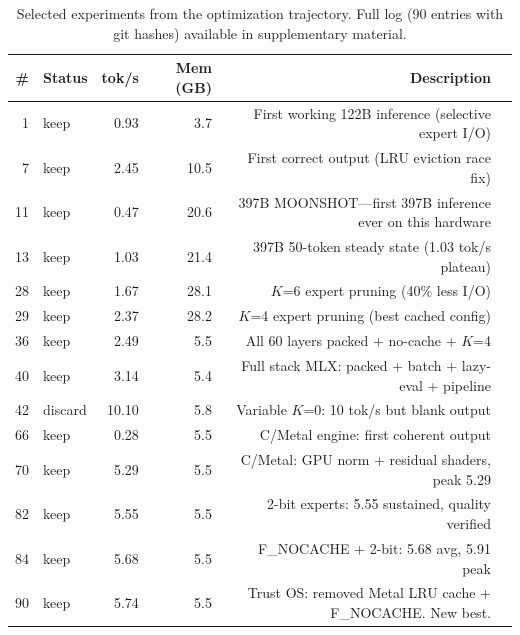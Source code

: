 \documentclass[11pt,twocolumn]{article}
\begin{document}
\begin{table}[h]
\centering
\footnotesize
\caption{Selected experiments from the optimization trajectory. Full log (90 entries with git hashes) available in supplementary material.}
\begin{tabular}{@{}rlrrrl@{}}
\toprule
\textbf{\#} & \textbf{Status} & \textbf{tok/s} & \textbf{Mem (GB)} & \textbf{Description} \\
\midrule
1 & keep & 0.93 & 3.7 & First working 122B inference (selective expert I/O) \\
7 & keep & 2.45 & 10.5 & First correct output (LRU eviction race fix) \\
11 & keep & 0.47 & 20.6 & 397B MOONSHOT---first 397B inference ever on this hardware \\
13 & keep & 1.03 & 21.4 & 397B 50-token steady state (1.03 tok/s plateau) \\
28 & keep & 1.67 & 28.1 & $K$=6 expert pruning (40\% less I/O) \\
29 & keep & 2.37 & 28.2 & $K$=4 expert pruning (best cached config) \\
36 & keep & 2.49 & 5.5 & All 60 layers packed + no-cache + $K$=4 \\
40 & keep & 3.14 & 5.4 & Full stack MLX: packed + batch + lazy-eval + pipeline \\
42 & discard & 10.10 & 5.8 & Variable $K$=0: 10 tok/s but blank output \\
66 & keep & 0.28 & 5.5 & C/Metal engine: first coherent output \\
70 & keep & 5.29 & 5.5 & C/Metal: GPU norm + residual shaders, peak 5.29 \\
82 & keep & 5.55 & 5.5 & 2-bit experts: 5.55 sustained, quality verified \\
84 & keep & 5.68 & 5.5 & F\_NOCACHE + 2-bit: 5.68 avg, 5.91 peak \\
90 & keep & 5.74 & 5.5 & Trust OS: removed Metal LRU cache + F\_NOCACHE. New best. \\
\bottomrule
\end{tabular}
\end{table}
\end{document}
